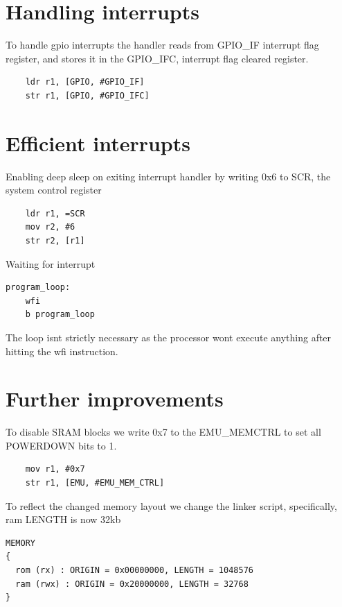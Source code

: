 \section{Handling interrupts}

To handle gpio interrupts the handler reads from GPIO\_IF interrupt flag register, and stores it in the GPIO\_IFC, interrupt flag cleared register.

\begin{lstlisting}
	ldr r1, [GPIO, #GPIO_IF]	
	str r1, [GPIO, #GPIO_IFC]	
\end{lstlisting}


\section{Efficient interrupts}

Enabling deep sleep on exiting interrupt handler by writing 0x6 to SCR, the system control register 

\begin{lstlisting}
	ldr r1, =SCR
	mov r2, #6
	str r2, [r1]	
\end{lstlisting}

Waiting for interrupt

\begin{lstlisting}
program_loop:
 	wfi
	b program_loop  	
\end{lstlisting}

The loop isnt strictly necessary as the processor wont execute anything after hitting the wfi instruction.

\section{Further improvements}

To disable SRAM blocks we write 0x7 to the EMU\_MEMCTRL to set all POWERDOWN bits to 1.

\begin{lstlisting}
	mov r1, #0x7
	str r1, [EMU, #EMU_MEM_CTRL]
\end{lstlisting}

To reflect the changed memory layout we change the linker script, specifically, ram LENGTH is now 32kb

\begin{lstlisting}
MEMORY
{
  rom (rx) : ORIGIN = 0x00000000, LENGTH = 1048576
  ram (rwx) : ORIGIN = 0x20000000, LENGTH = 32768
}
\end{lstlisting}

